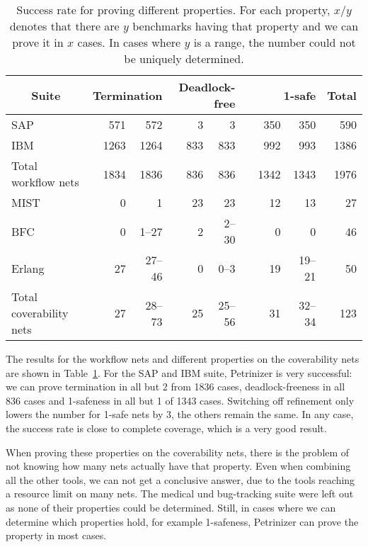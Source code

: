 \begin{table}[t]
  \centering
  \caption[Success rate for proving different properties.] 
  {Success rate for proving different properties.
   For each property, $x$/$y$ denotes that there are $y$ benchmarks
   having that property and we can prove it in $x$ cases. In cases
   where $y$ is a range, the number could not be uniquely determined.}
\label{table:rate-of-success-misc}
    \begin{tabular}{lrr@{/}rrr@{/}rrr@{/}rr}
    \toprule
    \multicolumn{1}{c}{Suite} &
    \multicolumn{3}{r}{Termination} &
    \multicolumn{3}{r}{Deadlock-free} &
    \multicolumn{3}{r}{1-safe} &
    \multicolumn{1}{c}{Total} \\
    \midrule
    SAP          & &  571 &   572 & &   3 &    3 & & 350 &   350 &  590 \\
    IBM          & & 1263 &  1264 & \hspace{0.7cm} & 833 & 833 & \hspace{0.2cm} & 992 & 993 & 1386 \\
    \midrule
    Total workflow nets  & & 1834 &  1836 & & 836 &  836 & & 1342 & 1343 & 1976 \\
    \midrule
    \midrule
    MIST         & &    0 &     1 & &  23 &   23 & &  12 &    13 &   27 \\
    BFC          & &    0 &  1–27 & &   2 & 2–30 & &   0 &     0 &   46 \\
    Erlang       & &   27 & 27–46 & &   0 &  0–3 & &  19 & 19–21 &   50 \\
    \midrule
    Total coverability nets  & & 27 & 28–73 & &  25 & 25–56 & & 31 & 32–34 & 123 \\
    \bottomrule
  \end{tabular}
\end{table}

The results for the workflow nets and different properties on the coverability nets
are shown in Table~\ref{table:rate-of-success-misc}.
For the SAP and IBM suite, Petrinizer is very successful: we can prove
termination in all but 2 from 1836 cases, deadlock-freeness in all 836 cases
and 1-safeness in all but 1 of 1343 cases. Switching off refinement only lowers
the number for 1-safe nets by 3, the others remain the same.
In any case, the success rate is close to complete coverage, which is a very good
result.

When proving these properties on the coverability nets, there is the problem
of not knowing how many nets actually have that property. Even when combining all the
other tools, we can not get a conclusive answer, due to the tools reaching
a resource limit on many nets. The medical und bug-tracking suite were
left out as none of their properties could be determined.
Still, in cases where we can determine which properties hold, for example 1-safeness,
Petrinizer can prove the property in most cases.


